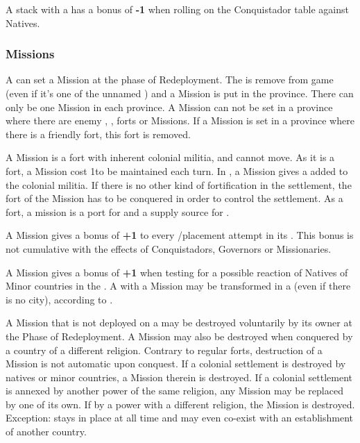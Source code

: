 \aparag[Conquistadors.] A stack with a \LeaderMis has a bonus of {\bf -1} when
rolling on the Conquistador table against Natives.

\subsubsection{Missions}
\aparag A \LeaderMis can set a Mission at the phase of Redeployment. The
\LeaderMis is remove from game (even if it's one of the unnamed \HIS
\LeaderMis) and a Mission is put in the province.
\bparag There can only be one Mission in each province. A Mission can not be
set in a province where there are enemy \COL, \TP, forts or Missions. If a
Mission is set in a province where there is a friendly fort, this fort is
removed.

\aparag A Mission is a fort with inherent colonial militia, and cannot
move. As it is a fort, a Mission cost 1\ducats to be maintained each turn.
\bparag In \COL, a Mission gives a \LDE added to the colonial militia.
\bparag If there is no other kind of fortification in the settlement, the fort
of the Mission has to be conquered in order to control the settlement.
\bparag As a fort, a mission is a port for \ND and a supply source for \LD.

\aparag A Mission gives a bonus of {\bf +1} to every \TP/\COL placement
attempt in its \Area.
\bparag This bonus is not cumulative with the effects of Conquistadors,
Governors or Missionaries.

\aparag A Mission gives a bonus of {\bf +1} when testing for a possible
reaction of Natives of Minor countries in the \Area.
\aparag A \TP with a Mission may be transformed in a \COL (even if there is no
city), according to .

\aparag A Mission that is not deployed on a \COL may be destroyed voluntarily
by its owner at the Phase of Redeployment.
\bparag A Mission may also be destroyed when conquered by a country of a
different religion. Contrary to regular forts, destruction of a Mission is not
automatic upon conquest.
\bparag If a colonial settlement is destroyed by natives or minor countries, a
Mission therein is destroyed.
\bparag If a colonial settlement is annexed by another power of the same
religion, any Mission may be replaced by one of its own. If by a power with a
different religion, the Mission is destroyed.
\bparag Exception:  stays in place at all time and may
even co-exist with an establishment of another country.

